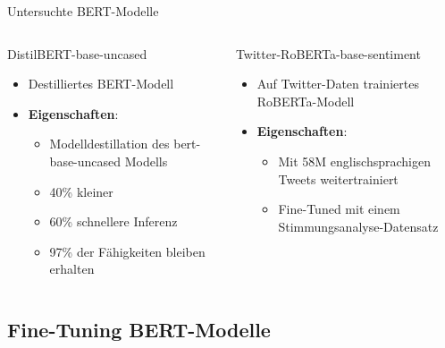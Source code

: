 \documentclass[aspectratio=169]{beamer} %
\begin{document}
\begin{frame}{Untersuchte BERT-Modelle}
\begin{columns}[T]
    \begin{block}{DistilBERT-base-uncased}
    \begin{itemize}
    \item Destilliertes BERT-Modell
    \item \textbf{Eigenschaften}:
      \begin{itemize}
      \item Modelldestillation des bert-base-uncased Modells
      \item 40\% kleiner
      \item 60\% schnellere Inferenz
      \item 97\% der Fähigkeiten bleiben erhalten
      \end{itemize}
    \end{itemize}
    \vspace{0.04cm}
    \end{block}
    \begin{block}{Twitter-RoBERTa-base-sentiment}
        \begin{itemize}
        \item Auf Twitter-Daten trainiertes RoBERTa-Modell
        \item \textbf{Eigenschaften}:
          \begin{itemize}
          \item Mit 58M englischsprachigen Tweets weitertrainiert
          \item Fine-Tuned mit einem Stimmungsanalyse-Datensatz
          \end{itemize}
        \end{itemize}
        \vfill
    \end{block}
\end{columns}
\end{frame}

\subsection{Fine-Tuning BERT-Modelle}
\end{document}
